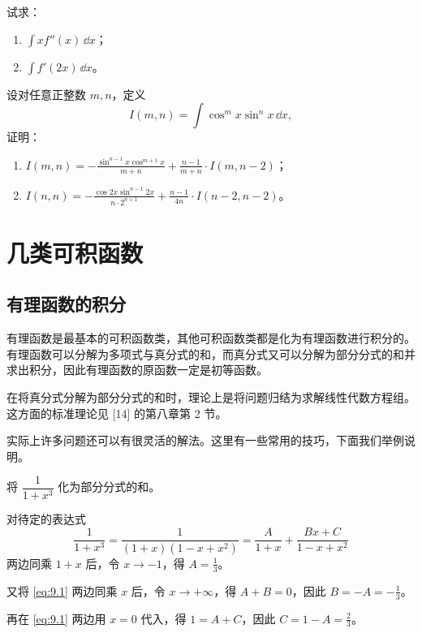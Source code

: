 \begin{xexercise}[5]
试求：
  \begin{enumerate}[label=(\arabic*)]
    \item $\displaystyle\int x f''(x)\,\dd x$；
    \item $\displaystyle\int f'(2x)\,\dd x$。
  \end{enumerate}
\end{xexercise}

\begin{xexercise}[6]
设对任意正整数 $m,n$，定义
  \[
    I(m,n)=\int\cos^mx\sin^nx\,\dd x,
  \]
  证明：
  \begin{enumerate}[label=(\arabic*)]
    \item $\displaystyle I(m,n)=-\frac{\sin^{n-1}x\cos^{m+1}x}{m+n}+\frac{n-1}{m+n}\cdot I(m,n-2)$；
    \item $\displaystyle I(n,n)=-\frac{\cos2x\sin^{n-1}2x}{n\cdot2^{n+1}}+\frac{n-1}{4n}\cdot I(n-2,n-2)$。
  \end{enumerate}
\end{xexercise}

\section{几类可积函数}

\subsection{有理函数的积分}

有理函数是最基本的可积函数类，其他可积函数类都是化为有理函数进行积分的。有理函数可以分解为多项式与真分式的和，而真分式又可以分解为部分分式的和并求出积分，因此有理函数的原函数一定是初等函数。

在将真分式分解为部分分式的和时，理论上是将问题归结为求解线性代数方程组。这方面的标准理论见 [14] 的第八章第 2 节。

实际上许多问题还可以有很灵活的解法。这里有一些常用的技巧，下面我们举例说明。

\begin{xexample}[9.2.1]
将 $\dfrac1{1+x^3}$ 化为部分分式的和。
\end{xexample}

\begin{xsolution}
对待定的表达式
\begin{equation}
  \frac1{1+x^3}
  =\frac1{(1+x)(1-x+x^2)}
  =\frac{A}{1+x}+\frac{Bx+C}{1-x+x^2}
  \tag{9.1}
  \label{eq:9.1}
\end{equation}
两边同乘 $1+x$ 后，令 $x\to-1$，得 $A=\frac13$。

又将 \eqref{eq:9.1} 两边同乘 $x$ 后，令 $x\to+\infty$，得 $A+B=0$，因此 $B=-A=-\frac13$。

再在 \eqref{eq:9.1} 两边用 $x=0$ 代入，得 $1=A+C$，因此 $C=1-A=\frac23$。
\end{xsolution}

